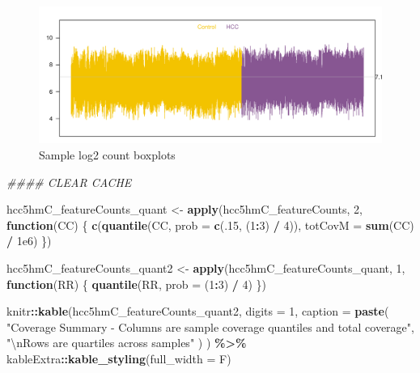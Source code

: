 \documentclass[
]{book}
\newenvironment{Shaded}{\begin{snugshade}}{\end{snugshade}}
\newcommand{\CharTok}[1]{\textcolor[rgb]{0.31,0.60,0.02}{#1}}
\newcommand{\CommentTok}[1]{\textcolor[rgb]{0.56,0.35,0.01}{\textit{#1}}}
\newcommand{\ControlFlowTok}[1]{\textcolor[rgb]{0.13,0.29,0.53}{\textbf{#1}}}
\newcommand{\DataTypeTok}[1]{\textcolor[rgb]{0.13,0.29,0.53}{#1}}
\newcommand{\DecValTok}[1]{\textcolor[rgb]{0.00,0.00,0.81}{#1}}
\newcommand{\FloatTok}[1]{\textcolor[rgb]{0.00,0.00,0.81}{#1}}
\newcommand{\KeywordTok}[1]{\textcolor[rgb]{0.13,0.29,0.53}{\textbf{#1}}}
\newcommand{\NormalTok}[1]{#1}
\newcommand{\OperatorTok}[1]{\textcolor[rgb]{0.81,0.36,0.00}{\textbf{#1}}}
\newcommand{\StringTok}[1]{\textcolor[rgb]{0.31,0.60,0.02}{#1}}
\begin{document}
\begin{figure}
\centering
\includegraphics{Static/figures/hcc5hmC-preproc-lcpmBxp-1.pdf}
\caption{\label{fig:hcc5hmC-preproc-lcpmBxp}Sample log2 count boxplots}
\end{figure}

\begin{Shaded}
\begin{Highlighting}[]
\CommentTok{\#\#\#\# CLEAR CACHE}

\NormalTok{hcc5hmC\_featureCounts\_quant <{-}}\StringTok{ }\KeywordTok{apply}\NormalTok{(hcc5hmC\_featureCounts, }\DecValTok{2}\NormalTok{, }\ControlFlowTok{function}\NormalTok{(CC) \{}
  \KeywordTok{c}\NormalTok{(}\KeywordTok{quantile}\NormalTok{(CC, }\DataTypeTok{prob =} \KeywordTok{c}\NormalTok{(.}\DecValTok{15}\NormalTok{, (}\DecValTok{1}\OperatorTok{:}\DecValTok{3}\NormalTok{) }\OperatorTok{/}\StringTok{ }\DecValTok{4}\NormalTok{)), }\DataTypeTok{totCovM =} \KeywordTok{sum}\NormalTok{(CC) }\OperatorTok{/}\StringTok{ }\FloatTok{1e6}\NormalTok{)}
\NormalTok{\})}

\NormalTok{hcc5hmC\_featureCounts\_quant2 <{-}}\StringTok{ }\KeywordTok{apply}\NormalTok{(hcc5hmC\_featureCounts\_quant, }\DecValTok{1}\NormalTok{, }\ControlFlowTok{function}\NormalTok{(RR) \{}
  \KeywordTok{quantile}\NormalTok{(RR, }\DataTypeTok{prob =}\NormalTok{ (}\DecValTok{1}\OperatorTok{:}\DecValTok{3}\NormalTok{) }\OperatorTok{/}\StringTok{ }\DecValTok{4}\NormalTok{)}
\NormalTok{\})}

\NormalTok{knitr}\OperatorTok{::}\KeywordTok{kable}\NormalTok{(hcc5hmC\_featureCounts\_quant2,}
  \DataTypeTok{digits =} \DecValTok{1}\NormalTok{,}
  \DataTypeTok{caption =} \KeywordTok{paste}\NormalTok{(}
    \StringTok{"Coverage Summary {-} Columns are sample coverage quantiles and total coverage"}\NormalTok{,}
    \StringTok{"}\CharTok{\textbackslash{}n}\StringTok{Rows are quartiles across samples"}
\NormalTok{  )}
\NormalTok{) }\OperatorTok{\%>\%}\StringTok{ }\NormalTok{kableExtra}\OperatorTok{::}\KeywordTok{kable\_styling}\NormalTok{(}\DataTypeTok{full\_width =}\NormalTok{ F)}
\end{Highlighting}
\end{Shaded}
\end{document}
